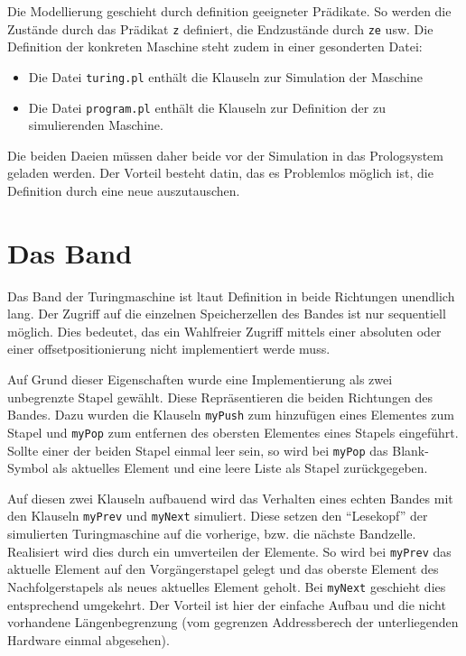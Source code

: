 \documentclass[final,a4paper,11pt,notitlepage,halfparskip]{scrreprt}
\begin{document}
Die Modellierung geschieht durch definition geeigneter Prädikate. So
werden die Zustände durch das Prädikat \texttt{z} definiert, die
Endzustände durch \texttt{ze} usw. Die Definition der konkreten Maschine
steht zudem in einer gesonderten Datei: 
\begin{itemize}
    \item Die Datei \texttt{turing.pl} enthält die Klauseln zur
	Simulation der Maschine
    \item Die Datei \texttt{program.pl} enthält die Klauseln zur
	Definition der zu simulierenden Maschine.	
\end{itemize}
Die beiden Daeien müssen daher beide vor der Simulation in das
Prologsystem geladen werden. Der Vorteil besteht datin, das es
Problemlos möglich ist, die Definition durch eine neue auszutauschen.

\section{Das Band}
Das Band der Turingmaschine ist ltaut Definition in beide Richtungen
unendlich lang. Der Zugriff auf die einzelnen Speicherzellen des Bandes
ist nur sequentiell möglich. Dies bedeutet, das ein Wahlfreier Zugriff
mittels einer absoluten oder einer offsetpositionierung nicht
implementiert werde muss.

Auf Grund dieser Eigenschaften wurde eine Implementierung als zwei
unbegrenzte Stapel gewählt. Diese Repräsentieren die beiden Richtungen
des Bandes. Dazu wurden die Klauseln \texttt{myPush} zum hinzufügen
eines Elementes zum Stapel und \texttt{myPop} zum entfernen des obersten
Elementes eines Stapels eingeführt. Sollte einer der beiden Stapel
einmal leer sein, so wird bei \texttt{myPop} das Blank-Symbol als 
aktuelles Element und eine leere Liste als Stapel zurückgegeben.

Auf diesen zwei Klauseln aufbauend wird das Verhalten eines echten
Bandes mit den Klauseln \texttt{myPrev} und \texttt{myNext} simuliert.
Diese setzen den "`Lesekopf"' der simulierten Turingmaschine auf die
vorherige, bzw. die nächste Bandzelle. Realisiert wird dies durch ein
umverteilen der Elemente. So wird bei \texttt{myPrev} das aktuelle
Element auf den Vorgängerstapel gelegt und das oberste Element des
Nachfolgerstapels als neues aktuelles Element geholt. Bei
\texttt{myNext} geschieht dies entsprechend umgekehrt. Der Vorteil ist
hier der einfache Aufbau und die nicht vorhandene Längenbegrenzung (vom
gegrenzen Addressberech der unterliegenden Hardware einmal abgesehen).
\end{document}
